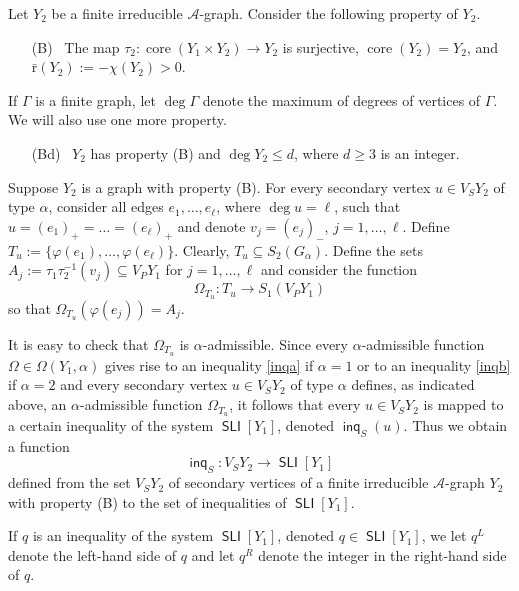 \documentclass[10pt, reqno]{amsart}
\numberwithin{equation}{section}
\begin{document}
Let $Y_2$ be a finite irreducible   ${\mathcal{A}}$-graph. Consider the following property of $Y_2$.
\begin{enumerate}
\item[(B)] \ The map $\tau_2  :  \operatorname{core} (Y_1  \times  Y_2) \to Y_2$ is surjective, $\operatorname{core}(Y_2) = Y_2$,
     and  $ {\bar {\mathrm{r}}}(Y_2) := - \chi(Y_2) > 0$.
     \end{enumerate}

If $\Gamma$ is a finite graph, let $\deg \Gamma$ denote the maximum
of degrees of vertices of $\Gamma$. We will also use one more  property.
\begin{enumerate}
\item[(Bd)] \  $Y_2$ has property (B) and $\deg Y_2 \le d$, where $d \ge 3$ is an integer.
\end{enumerate}

Suppose $Y_2$ is a graph with property (B).
For every secondary vertex $u \in V_S Y_2$ of type ${\alpha}$,  consider
all edges $e_1, \dots, e_\ell$, where $\deg u = \ell$, such that
 $u = (e_1)_+=  \dots = (e_\ell)_+$ and denote   $v_j = (e_j)_-$, $j =1, \dots, \ell$.  Define   $T_u:= \{ {\varphi}(e_1), \dots , {\varphi}(e_\ell) \}$.
 Clearly,  $T_u \subseteq S_2(G_{\alpha})$.
 Define  the sets $A_j := \tau_1  \tau_2^{-1}(v_j) \subseteq V_P Y_1$ for $j=1, \dots, \ell$ and consider the function $$
 {\Omega}_{T_u} : T_u \to S_1(V_P Y_1)
 $$
 so that ${\Omega}_{T_u}({\varphi}(e_j)) = A_j$.

It is easy to check that  $\Omega_{T_u}$ is ${\alpha}$-admissible.
Since every  ${\alpha}$-admissible function $\Omega \in \Omega(Y_1, {\alpha})$
gives rise to  an inequality \eqref{inqa}  if ${\alpha} =1$ or  to an inequality \eqref{inqb}  if ${\alpha}=2 $ and every
secondary vertex $u \in V_S Y_2$  of type ${\alpha}$  defines, as indicated above, an ${\alpha}$-admissible  function  $\Omega_{T_u}$, it follows that every  $u \in V_S Y_2$ is mapped to a certain inequality
of the system  $\operatorname{\textsf{SLI}}[Y_1]$, denoted $\operatorname{\textsf{inq}}_S(u)$.  Thus we obtain a function
\begin{equation*}
\operatorname{\textsf{inq}}_S : V_S Y_2 \to \operatorname{\textsf{SLI}}[Y_1]
\end{equation*}
defined from the set $V_S Y_2$ of secondary vertices of a finite irreducible ${\mathcal{A}}$-graph  $Y_2$ with property (B)
to the set of inequalities of $\operatorname{\textsf{SLI}}[Y_1]$.

If $q$ is an inequality of the system $\operatorname{\textsf{SLI}}[Y_1]$, denoted  $q \in \operatorname{\textsf{SLI}}[Y_1]$, we let $q^L$ denote the left-hand side of $q$ and let  $q^R$ denote the integer in the right-hand side of $q$.
\end{document}
